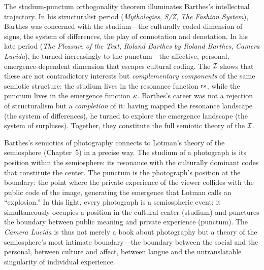 \begin{interpretation}
The studium-punctum orthogonality theorem illuminates Barthes's intellectual trajectory. In his structuralist period (\textit{Mythologies}, \textit{S/Z}, \textit{The Fashion System}), Barthes was concerned with the studium---the culturally coded dimension of signs, the system of differences, the play of connotation and denotation. In his late period (\textit{The Pleasure of the Text}, \textit{Roland Barthes by Roland Barthes}, \textit{Camera Lucida}), he turned increasingly to the punctum---the affective, personal, emergence-dependent dimension that escapes cultural coding. The $\mathcal{I}$ shows that these are not contradictory interests but \emph{complementary components} of the same semiotic structure: the studium lives in the resonance function $\mathrm{rs}$, while the punctum lives in the emergence function $\kappa$. Barthes's career was not a rejection of structuralism but a \emph{completion} of it: having mapped the resonance landscape (the system of differences), he turned to explore the emergence landscape (the system of surpluses). Together, they constitute the full semiotic theory of the $\mathcal{I}$.
\end{interpretation}

\begin{remark}
Barthes's semiotics of photography connects to Lotman's theory of the semiosphere (Chapter~5) in a precise way. The studium of a photograph is its position within the semiosphere: its resonance with the culturally dominant codes that constitute the center. The punctum is the photograph's position at the boundary: the point where the private experience of the viewer collides with the public code of the image, generating the emergence that Lotman calls an ``explosion.'' In this light, every photograph is a semiospheric event: it simultaneously occupies a position in the cultural center (studium) and punctures the boundary between public meaning and private experience (punctum). The \textit{Camera Lucida} is thus not merely a book about photography but a theory of the semiosphere's most intimate boundary---the boundary between the social and the personal, between culture and affect, between langue and the untranslatable singularity of individual experience.
\end{remark}



